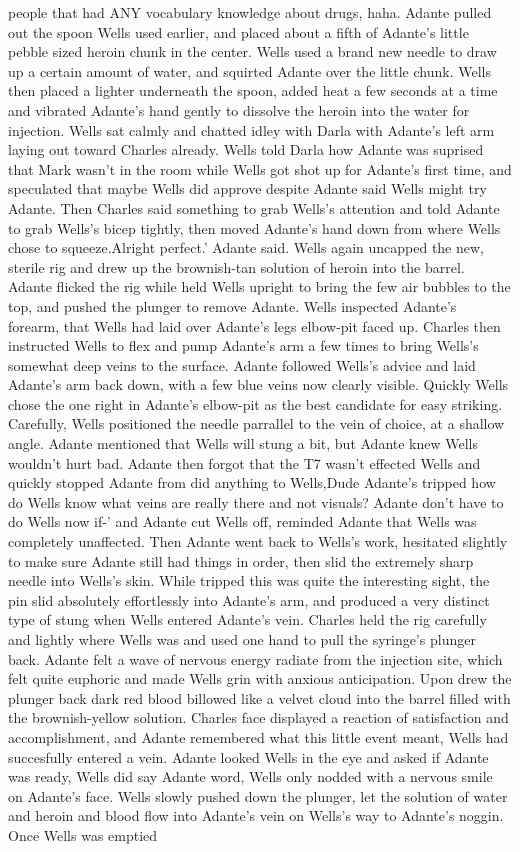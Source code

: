 \documentclass[12pt]{book}
\begin{document}
people that had ANY vocabulary knowledge about drugs, haha. Adante pulled out the spoon Wells used earlier, and placed about a fifth of Adante's little pebble sized heroin chunk in the center. Wells used a brand new needle to draw up a certain amount of water, and squirted Adante over the little chunk. Wells then placed a lighter underneath the spoon, added heat a few seconds at a time and vibrated Adante's hand gently to dissolve the heroin into the water for injection. Wells sat calmly and chatted idley with Darla with Adante's left arm laying out toward Charles already. Wells told Darla how Adante was suprised that Mark wasn't in the room while Wells got shot up for Adante's first time, and speculated that maybe Wells did approve despite Adante said Wells might try Adante. Then Charles said something to grab Wells's attention and told Adante to grab Wells's bicep tightly, then moved Adante's hand down from where Wells chose to squeeze.Alright perfect.' Adante said. Wells again uncapped the new, sterile rig and drew up the brownish-tan solution of heroin into the barrel. Adante flicked the rig while held Wells upright to bring the few air bubbles to the top, and pushed the plunger to remove Adante. Wells inspected Adante's forearm, that Wells had laid over Adante's legs elbow-pit faced up. Charles then instructed Wells to flex and pump Adante's arm a few times to bring Wells's somewhat deep veins to the surface. Adante followed Wells's advice and laid Adante's arm back down, with a few blue veins now clearly visible. Quickly Wells chose the one right in Adante's elbow-pit as the best candidate for easy striking. Carefully, Wells positioned the needle parrallel to the vein of choice, at a shallow angle. Adante mentioned that Wells will stung a bit, but Adante knew Wells wouldn't hurt bad. Adante then forgot that the T7 wasn't effected Wells and quickly stopped Adante from did anything to Wells,Dude Adante's tripped how do Wells know what veins are really there and not visuals? Adante don't have to do Wells now if-' and Adante cut Wells off, reminded Adante that Wells was completely unaffected. Then Adante went back to Wells's work, hesitated slightly to make sure Adante still had things in order, then slid the extremely sharp needle into Wells's skin. While tripped this was quite the interesting sight, the pin slid absolutely effortlessly into Adante's arm, and produced a very distinct type of stung when Wells entered Adante's vein. Charles held the rig carefully and lightly where Wells was and used one hand to pull the syringe's plunger back. Adante felt a wave of nervous energy radiate from the injection site, which felt quite euphoric and made Wells grin with anxious anticipation. Upon drew the plunger back dark red blood billowed like a velvet cloud into the barrel filled with the brownish-yellow solution. Charles face displayed a reaction of satisfaction and accomplishment, and Adante remembered what this little event meant, Wells had succesfully entered a vein. Adante looked Wells in the eye and asked if Adante was ready, Wells did say Adante word, Wells only nodded with a nervous smile on Adante's face. Wells slowly pushed down the plunger, let the solution of water and heroin and blood flow into Adante's vein on Wells's way to Adante's noggin. Once Wells was emptied 
\end{document}
